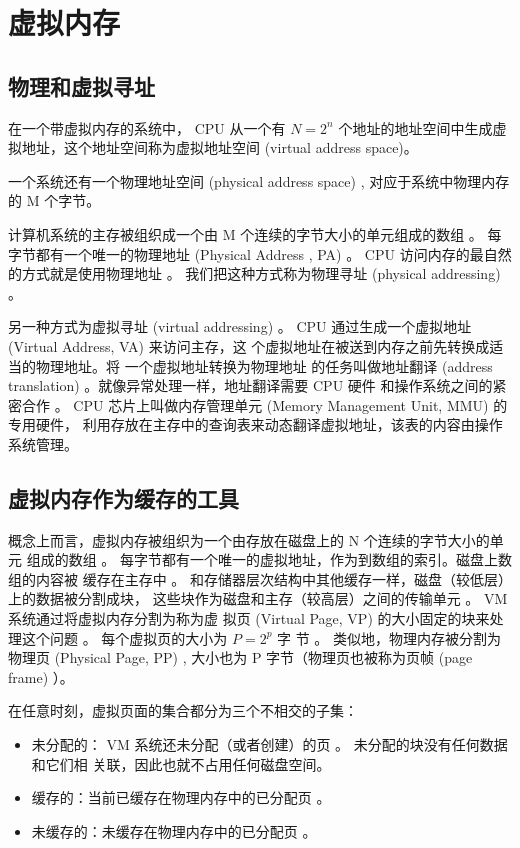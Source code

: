 \section{虚拟内存}

\subsection{物理和虚拟寻址}

在一个带虚拟内存的系统中， CPU 从一个有 $N=2^n$ 个地址的地址空间中生成虚拟地址，这个地址空间称为虚拟地址空间 (virtual address space)。

一个系统还有一个物理地址空间 (physical address space) , 对应于系统中物理内存的 M 个字节。

计算机系统的主存被组织成一个由 M 个连续的字节大小的单元组成的数组 。 每字节都有一个唯一的物理地址 (Physical Address , PA) 。
CPU 访问内存的最自然的方式就是使用物理地址 。 我们把这种方式称为物理寻址 (physical addressing) 。

另一种方式为虚拟寻址 (virtual addressing) 。 CPU 通过生成一个虚拟地址 (Virtual Address, VA) 来访问主存，这
个虚拟地址在被送到内存之前先转换成适当的物理地址。将 一个虚拟地址转换为物理地址
的任务叫做地址翻译 (address translation) 。就像异常处理一样，地址翻译需要 CPU 硬件
和操作系统之间的紧密合作 。 CPU 芯片上叫做内存管理单元 (Memory Management Unit, MMU) 的专用硬件，
利用存放在主存中的查询表来动态翻译虚拟地址，该表的内容由操作系统管理。

\subsection{虚拟内存作为缓存的工具}

概念上而言，虚拟内存被组织为一个由存放在磁盘上的 N 个连续的字节大小的单元
组成的数组 。 每字节都有一个唯一的虚拟地址，作为到数组的索引。磁盘上数组的内容被
缓存在主存中 。 和存储器层次结构中其他缓存一样，磁盘（较低层）上的数据被分割成块，
这些块作为磁盘和主存（较高层）之间的传输单元 。 VM 系统通过将虚拟内存分割为称为虚
拟页 (Virtual Page, VP) 的大小固定的块来处理这个问题 。 每个虚拟页的大小为 $P=2^p$ 字
节 。 类似地，物理内存被分割为物理页 (Physical Page, PP) , 大小也为 P 字节（物理页也被称为页帧 (page frame) ）。

在任意时刻，虚拟页面的集合都分为三个不相交的子集：
\begin{itemize}
    \item 未分配的： VM 系统还未分配（或者创建）的页 。 未分配的块没有任何数据和它们相
          关联，因此也就不占用任何磁盘空间。
    \item 缓存的：当前已缓存在物理内存中的已分配页 。
    \item 未缓存的：未缓存在物理内存中的已分配页 。
\end{itemize}

